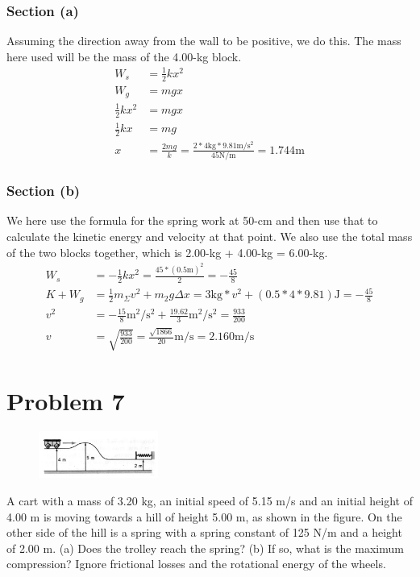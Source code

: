 \documentclass[12pt]{article}
\begin{document}
\subsubsection*{Section (a)}
Assuming the direction away from the wall to be positive, we do this. The mass here used will be the mass of the 4.00-kg block. 
\begin{align*}
    W_s &=  \frac{1}{2}kx^2\\
    W_g &=  mgx\\
    \frac{1}{2}kx^2 &=  mgx\\
    \frac{1}{2}kx   &=  mg\\
    x   &=  \frac{2mg}{k} = \frac{2*4\unit{\kilo\gram}*9.81\unit{\meter/\second^2}}{45\unit{\newton/\meter}} = \boxed{1.744\unit{\meter}}
\end{align*}

\pagebreak
\subsubsection*{Section (b)}
We here use the formula for the spring work at 50-cm and then use that to calculate the kinetic energy and velocity at that point. We also use the total mass of the two blocks together, which is 2.00-kg + 4.00-kg = 6.00-kg.
\begin{align*}
    W_s &=  -\frac{1}{2} kx^2 = \frac{45*(0.5\unit{\meter})^2}{2} = -\frac{45}{8}\\
    K + W_g &=  \frac{1}{2}m_\Sigma v^2 + m_2g \Delta x 
            = 3\unit{\kilo\gram}*v^2 + (0.5*4*9.81)\unit{\joule} = -\frac{45}{8}\\
    v^2 &=  -\frac{15}{8}\unit{\meter^2/\second^2} + \frac{19.62}{3}\unit{\meter^2/\second^2} = \frac{933}{200}\\
    v   &=  \sqrt{\frac{933}{200}} = \boxed{\frac{\sqrt{1866}}{20} \unit{\meter/\second} = 2.160 \unit{\meter/\second}}
\end{align*}

\pagebreak
\section*{Problem 7}
\begin{figure}
    \vspace{-30pt}
    \includegraphics[width=0.35\textwidth]{graph_7.png} 
\end{figure}
A cart with a mass of 3.20 kg, an initial speed of 5.15 m/s and an initial height of 4.00 m is moving towards a hill of height 5.00 m, as shown in the figure. On the other side of the hill is a spring with a spring constant of 125 N/m and a height of 2.00 m. (a) Does the trolley reach the spring? (b) If so, what is the maximum compression? Ignore frictional losses and the rotational energy of the wheels.
\end{document}
